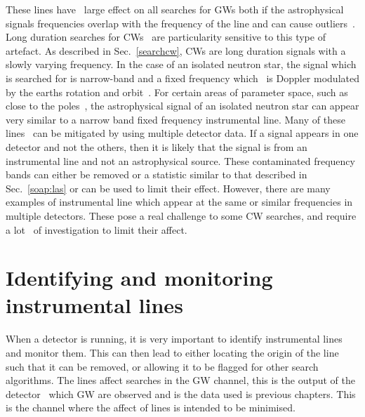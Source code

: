 %

These lines have~ large effect on all searches for \glspl{GW} both if
the astrophysical signals frequencies overlap with the frequency of the line
and can cause outliers~.  Long duration searches for \glspl{CW}~ are
particularity sensitive to this type of artefact.  As described in
Sec.~\ref{searchcw}, \glspl{CW} are long duration signals with a slowly varying
frequency.  In the case of an isolated neutron star, the signal which is
searched for is narrow-band and a fixed frequency which~ is Doppler modulated by
the earths rotation and orbit~. For certain areas of parameter space, such as
close to the poles~, the astrophysical signal of an isolated neutron star can
appear very similar to a narrow band fixed frequency instrumental line.  Many
of these lines~ can be mitigated by using multiple detector data. If a signal
appears in one detector and not the others, then it is likely that the signal
is from an instrumental line and not an astrophysical source.  These
contaminated frequency bands can either be removed or a statistic similar to
that described in Sec.~\ref{soap:las} or \citep{keitel2014SearchContinuous} can
be used to limit their effect.  However, there are many examples of
instrumental line which appear at the same or similar frequencies in multiple
detectors.  These pose a real challenge to some \gls{CW} searches, and require
a lot~ of investigation to limit their affect.

\section{\label{detchar:monitor}Identifying and monitoring instrumental lines}
%

When a detector is running, it is very important to identify instrumental lines
and monitor them.  This can then lead to either locating the origin of the line
such that it can be removed, or allowing it to be flagged for other search
algorithms.  The lines affect searches in the \gls{GW} channel, this is the
output of the detector~ which \gls{GW} are observed and is the data used is
previous chapters.  This is the channel where the affect of lines is intended
to be minimised.~

